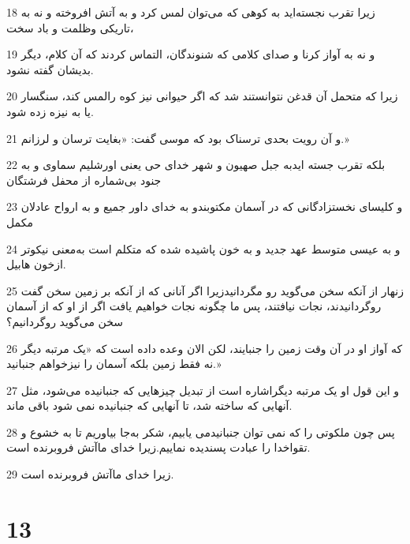 \par 18 زیرا تقرب نجسته‌اید به کوهی که می‌توان لمس کرد و به آتش افروخته و نه به تاریکی وظلمت و باد سخت،
\par 19 و نه به آواز کرنا و صدای کلامی که شنوندگان، التماس کردند که آن کلام، دیگر بدیشان گفته نشود.
\par 20 زیرا که متحمل آن قدغن نتوانستند شد که اگر حیوانی نیز کوه رالمس کند، سنگسار یا به نیزه زده شود.
\par 21 و آن رویت بحدی ترسناک بود که موسی گفت: «بغایت ترسان و لرزانم.»
\par 22 بلکه تقرب جسته ایدبه جبل صهیون و شهر خدای حی یعنی اورشلیم سماوی و به جنود بی‌شماره از محفل فرشتگان
\par 23 و کلیسای نخستزادگانی که در آسمان مکتوبندو به خدای داور جمیع و به ارواح عادلان مکمل
\par 24 و به عیسی متوسط عهد جدید و به خون پاشیده شده که متکلم است به‌معنی نیکوتر ازخون هابیل.
\par 25 زنهار از آنکه سخن می‌گوید رو مگردانیدزیرا اگر آنانی که از آنکه بر زمین سخن گفت روگردانیدند، نجات نیافتند، پس ما چگونه نجات خواهیم یافت اگر از او که از آسمان سخن می‌گوید روگردانیم؟
\par 26 که آواز او در آن وقت زمین را جنبایند، لکن الان وعده داده است که «یک مرتبه دیگر نه فقط زمین بلکه آسمان را نیزخواهم جنبانید.»
\par 27 و این قول او یک مرتبه دیگراشاره است از تبدیل چیزهایی که جنبانیده می‌شود، مثل آنهایی که ساخته شد، تا آنهایی که جنبانیده نمی شود باقی ماند.
\par 28 پس چون ملکوتی را که نمی توان جنبانیدمی یابیم، شکر به‌جا بیاوریم تا به خشوع و تقواخدا را عبادت پسندیده نماییم.زیرا خدای ماآتش فروبرنده است.
\par 29 زیرا خدای ماآتش فروبرنده است.

\chapter{13}

